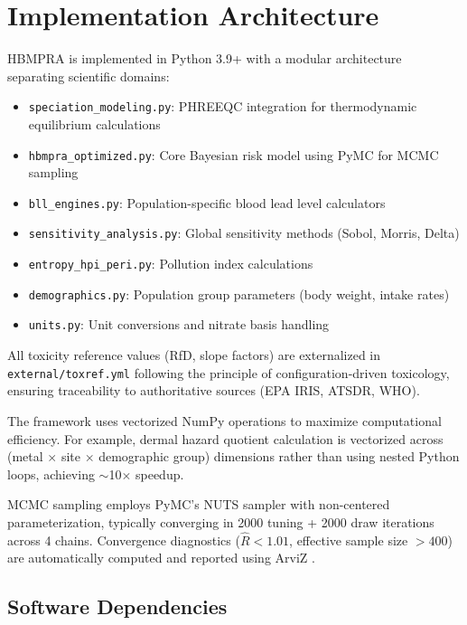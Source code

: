 \documentclass[11pt,a4paper]{article}
\begin{document}
\section{Implementation Architecture}

HBMPRA is implemented in Python 3.9+ with a modular architecture separating scientific domains:

\begin{itemize}
    \item \texttt{speciation\_modeling.py}: PHREEQC integration for thermodynamic equilibrium calculations
    \item \texttt{hbmpra\_optimized.py}: Core Bayesian risk model using PyMC for MCMC sampling
    \item \texttt{bll\_engines.py}: Population-specific blood lead level calculators
    \item \texttt{sensitivity\_analysis.py}: Global sensitivity methods (Sobol, Morris, Delta)
    \item \texttt{entropy\_hpi\_peri.py}: Pollution index calculations
    \item \texttt{demographics.py}: Population group parameters (body weight, intake rates)
    \item \texttt{units.py}: Unit conversions and nitrate basis handling
\end{itemize}

All toxicity reference values (RfD, slope factors) are externalized in \texttt{external/toxref.yml} following the principle of configuration-driven toxicology, ensuring traceability to authoritative sources (EPA IRIS, ATSDR, WHO).

The framework uses vectorized NumPy operations to maximize computational efficiency. For example, dermal hazard quotient calculation is vectorized across (metal $\times$ site $\times$ demographic group) dimensions rather than using nested Python loops, achieving $\sim$10$\times$ speedup.

MCMC sampling employs PyMC's NUTS sampler \citep{Salvatier:2016} with non-centered parameterization, typically converging in 2000 tuning + 2000 draw iterations across 4 chains. Convergence diagnostics ($\hat{R} < 1.01$, effective sample size $> 400$) are automatically computed and reported using ArviZ \citep{Kumar:2019}.

\subsection{Software Dependencies}
\end{document}
